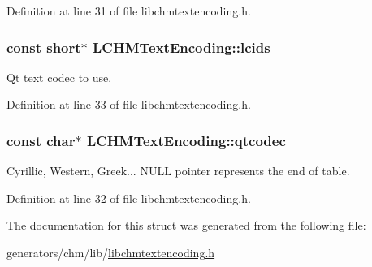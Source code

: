 Definition at line 31 of file libchmtextencoding.\+h.

\hypertarget{structLCHMTextEncoding_afd6331430de9c0ecd180732eb34fabb0}{
\subsubsection[{lcids}]{\setlength{\rightskip}{0pt plus 5cm}const short$\ast$ L\+C\+H\+M\+Text\+Encoding\+::lcids}}\label{structLCHMTextEncoding_afd6331430de9c0ecd180732eb34fabb0}


Qt text codec to use. 



Definition at line 33 of file libchmtextencoding.\+h.

\hypertarget{structLCHMTextEncoding_a568ebc6339c15035490e8d9c0c1f9959}{
\subsubsection[{qtcodec}]{\setlength{\rightskip}{0pt plus 5cm}const char$\ast$ L\+C\+H\+M\+Text\+Encoding\+::qtcodec}}\label{structLCHMTextEncoding_a568ebc6339c15035490e8d9c0c1f9959}


Cyrillic, Western, Greek... N\+U\+L\+L pointer represents the end of table. 



Definition at line 32 of file libchmtextencoding.\+h.



The documentation for this struct was generated from the following file\+:\begin{DoxyCompactItemize}
\item 
generators/chm/lib/\hyperlink{libchmtextencoding_8h}{libchmtextencoding.\+h}\end{DoxyCompactItemize}
